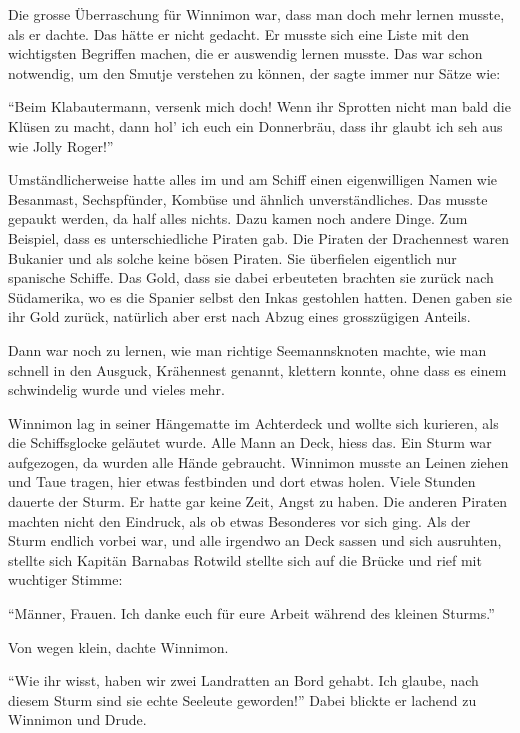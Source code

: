 Die grosse Überraschung für Winnimon war, dass man doch mehr lernen musste, als er dachte. Das hätte er nicht gedacht. Er musste sich eine Liste mit den wichtigsten Begriffen machen, die er auswendig lernen musste. Das war schon notwendig, um den Smutje verstehen zu können, der sagte immer nur Sätze wie:

\enquote{Beim Klabautermann, versenk mich doch! Wenn ihr Sprotten nicht man bald die Klüsen zu macht, dann hol' ich euch ein Donnerbräu, dass ihr glaubt ich seh aus wie Jolly Roger!}

Umständlicherweise hatte alles im und am Schiff einen eigenwilligen Namen wie Besanmast, Sechspfünder, Kombüse und ähnlich unverständliches. Das musste gepaukt werden, da half alles nichts. Dazu kamen noch andere Dinge. Zum Beispiel, dass es unterschiedliche Piraten gab. Die Piraten der Drachennest waren Bukanier und als solche keine bösen Piraten. Sie überfielen eigentlich nur spanische Schiffe. Das Gold, dass sie dabei erbeuteten brachten sie zurück nach Südamerika, wo es die Spanier selbst den Inkas gestohlen hatten. Denen gaben sie ihr Gold zurück, natürlich aber erst nach Abzug eines grosszügigen Anteils.

Dann war noch zu lernen, wie man richtige Seemannsknoten machte, wie man schnell in den Ausguck, Krähennest genannt, klettern konnte, ohne dass es einem schwindelig wurde und vieles mehr.






Winnimon lag in seiner Hängematte im Achterdeck und wollte sich kurieren, als die Schiffsglocke geläutet wurde. Alle Mann an Deck, hiess das. Ein Sturm war aufgezogen, da wurden alle Hände gebraucht. Winnimon musste an Leinen ziehen und Taue tragen, hier etwas festbinden und dort etwas holen. Viele Stunden dauerte der Sturm. Er hatte gar keine Zeit, Angst zu haben. Die anderen Piraten machten nicht den Eindruck, als ob etwas Besonderes vor sich ging. Als der Sturm endlich vorbei war, und alle irgendwo an Deck sassen und sich ausruhten, stellte sich Kapitän Barnabas Rotwild stellte sich auf die Brücke und rief mit wuchtiger Stimme:

\enquote{Männer, Frauen. Ich danke euch für eure Arbeit während des kleinen Sturms.}

Von wegen klein, dachte Winnimon.

\enquote{Wie ihr wisst, haben wir zwei Landratten an Bord gehabt. Ich glaube, nach diesem Sturm sind sie echte Seeleute geworden!} Dabei blickte er lachend zu Winnimon und Drude.


